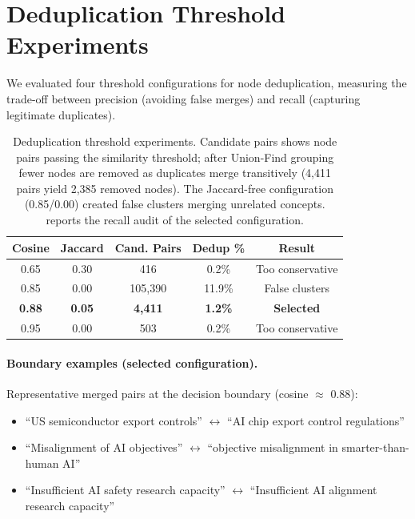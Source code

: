 \documentclass[10pt,twocolumn,letterpaper]{article}
\begin{document}
\section{Deduplication Threshold Experiments}
\label{app:dedup}

We evaluated four threshold configurations for node deduplication, measuring the
trade-off between precision (avoiding false merges) and recall (capturing legitimate
duplicates).

\begin{table}[h]
\centering
\small
\begin{tabular}{ccccc}
\toprule
\textbf{Cosine} & \textbf{Jaccard} & \textbf{Cand. Pairs} & \textbf{Dedup \%} & \textbf{Result} \\
\midrule
0.65 & 0.30 & 416 & 0.2\% & Too conservative \\
0.85 & 0.00 & 105,390 & 11.9\% & False clusters \\
\textbf{0.88} & \textbf{0.05} & \textbf{4,411} & \textbf{1.2\%} & \textbf{Selected} \\
0.95 & 0.00 & 503 & 0.2\% & Too conservative \\
\bottomrule
\end{tabular}
\caption{Deduplication threshold experiments. Candidate pairs shows node pairs passing
the similarity threshold; after Union-Find grouping fewer nodes are removed as duplicates
merge transitively (4{,}411 pairs yield 2{,}385 removed nodes). The Jaccard-free
configuration (0.85/0.00) created false clusters merging unrelated concepts.
 reports the recall audit of the selected configuration.}
\label{tab:dedup-thresholds}
\end{table}

\paragraph{Boundary examples (selected configuration).} Representative merged pairs at
the decision boundary (cosine $\approx$ 0.88):
\begin{itemize}
\setlength{\itemsep}{0pt}
\item ``US semiconductor export controls'' $\leftrightarrow$ ``AI chip export control regulations''
\item ``Misalignment of AI objectives'' $\leftrightarrow$ ``objective misalignment in smarter-than-human AI''
\item ``Insufficient AI safety research capacity'' $\leftrightarrow$ ``Insufficient AI alignment research capacity''
\end{itemize}
\end{document}
